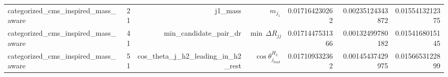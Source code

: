\begin{table}[htbp]
{\begin{tabular}{lrrrrrr}
categorized\_cms\_inspired\_mass\_aware & 21 & j1\_mass & $m_{j_1}$ & 0.017164230262 & 0.00235124343872 & 0.0155413212375 \\
categorized\_cms\_inspired\_mass\_aware & 41 & min\_candidate\_pair\_dr & $\min\,\Delta R_{jj}$ & 0.0171447531366 & 0.00132499780182 & 0.0154168015145 \\
categorized\_cms\_inspired\_mass\_aware & 51 & cos\_theta\_j\_h2\_leading\_in\_h2\_rest & $\cos\theta_{j_{\mathrm{lead}}}^{H_2}$ & 0.017109332362 & 0.00145437429975 & 0.0156653122899 \\
\bottomrule
\end{tabular}
}
\end{table}
